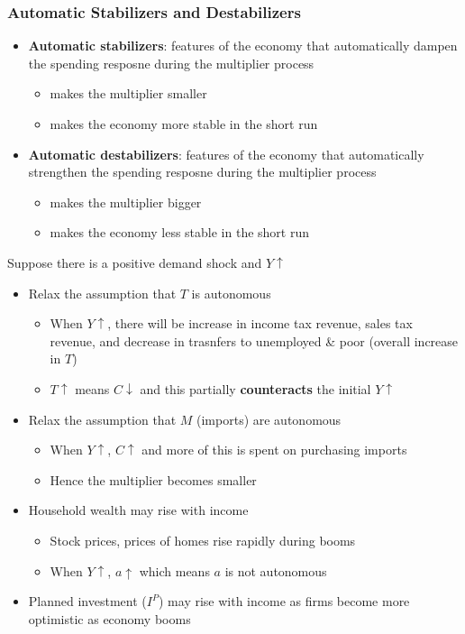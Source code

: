 \documentclass{article}
\begin{document}
\begin{multicols}{2}
\subsubsection{Automatic Stabilizers and Destabilizers}
\begin{itemize}
	\item \textbf{Automatic stabilizers}: features of the economy that automatically dampen the spending resposne during the multiplier process
	\begin{itemize}
		\item makes the multiplier smaller
		\item makes the economy more stable in the short run
	\end{itemize}
	\item \textbf{Automatic destabilizers}: features of the economy that automatically strengthen the spending resposne during the multiplier process
	\begin{itemize}
		\item makes the multiplier bigger
		\item makes the economy less stable in the short run
	\end{itemize}
\end{itemize}
Suppose there is a positive demand shock and $Y \uparrow$
\begin{itemize}
	\item Relax the assumption that $T$ is autonomous
	\begin{itemize}
		\item When $Y \uparrow$, there will be increase in income tax revenue, sales tax revenue, and decrease in trasnfers to unemployed \& poor (overall increase in $T$)
		\item $T \uparrow$ means $C\downarrow$ and this partially \textbf{counteracts} the initial $Y\uparrow$
	\end{itemize}
	\item Relax the assumption that $M$ (imports) are autonomous
	\begin{itemize}
		\item When $Y \uparrow$, $C \uparrow$ and more of this is spent on purchasing imports
		\item Hence the multiplier becomes smaller
	\end{itemize}
    \item Household wealth may rise with income
    \begin{itemize}
    	\item Stock prices, prices of homes rise rapidly during booms
    	\item When $Y\uparrow$, $a \uparrow$ which means $a$ is not autonomous
    \end{itemize}
    \item Planned investment ($I^P$) may rise with income as firms become more optimistic as economy booms
\end{itemize}


\end{multicols}
\end{document}
